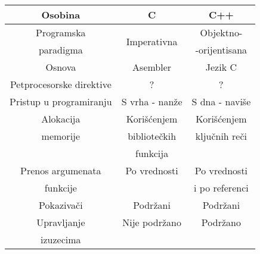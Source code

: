 \documentclass[a4paper]{article}
\begin{document}
{%
\begin{tabular}{|c|c|c|}
\hline
Osobina & C & C++ \\
\hline
Programska & \multirow{2}{5em}{Imperativna} & Objektno- \\
paradigma & & -orijentisana\\
\hline
Osnova & Asembler & Jezik C \\
\hline
Petprocesorske direktive & ? & ?\\
\hline
Pristup u programiranju & S vrha - nanže & S dna - naviše\\
\hline
Alokacija & Korišćenjem  & Korišćenjem \\
memorije & bibliotečkih & ključnih reči\\
& funkcija &\\
\hline
Prenos argumenata & Po vrednosti & Po vrednosti\\
funkcije & & i po referenci\\
\hline
Pokazivači & Podržani & Podržani\\
\hline
Upravljanje & Nije podržano & Podržano \\
izuzecima & &\\
\hline
\end{tabular}

}
\end{document}
